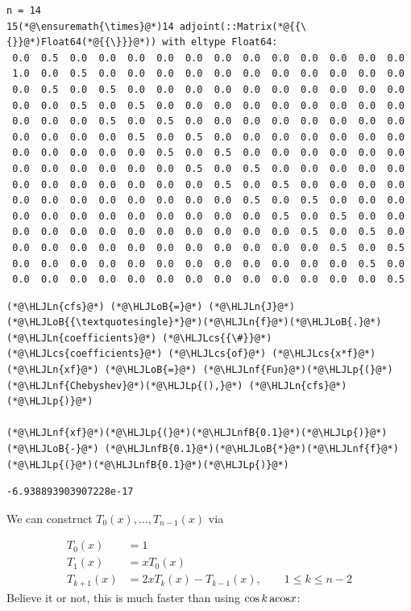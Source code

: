\documentclass[12pt,a4paper]{article}
\newcommand{\HLJLn}[1]{#1}
\newcommand{\HLJLnf}[1]{\textcolor[RGB]{66,102,213}{#1}}
\newcommand{\HLJLnfB}[1]{\textcolor[RGB]{59,151,46}{#1}}
\newcommand{\HLJLoB}[1]{\textcolor[RGB]{102,102,102}{\textbf{#1}}}
\newcommand{\HLJLp}[1]{#1}
\newcommand{\HLJLcs}[1]{\textcolor[RGB]{153,153,119}{\textit{#1}}}
\begin{document}
\begin{lstlisting}
n = 14
15(*@\ensuremath{\times}@*)14 adjoint(::Matrix(*@{{\{}}@*)Float64(*@{{\}}}@*)) with eltype Float64:
 0.0  0.5  0.0  0.0  0.0  0.0  0.0  0.0  0.0  0.0  0.0  0.0  0.0  0.0
 1.0  0.0  0.5  0.0  0.0  0.0  0.0  0.0  0.0  0.0  0.0  0.0  0.0  0.0
 0.0  0.5  0.0  0.5  0.0  0.0  0.0  0.0  0.0  0.0  0.0  0.0  0.0  0.0
 0.0  0.0  0.5  0.0  0.5  0.0  0.0  0.0  0.0  0.0  0.0  0.0  0.0  0.0
 0.0  0.0  0.0  0.5  0.0  0.5  0.0  0.0  0.0  0.0  0.0  0.0  0.0  0.0
 0.0  0.0  0.0  0.0  0.5  0.0  0.5  0.0  0.0  0.0  0.0  0.0  0.0  0.0
 0.0  0.0  0.0  0.0  0.0  0.5  0.0  0.5  0.0  0.0  0.0  0.0  0.0  0.0
 0.0  0.0  0.0  0.0  0.0  0.0  0.5  0.0  0.5  0.0  0.0  0.0  0.0  0.0
 0.0  0.0  0.0  0.0  0.0  0.0  0.0  0.5  0.0  0.5  0.0  0.0  0.0  0.0
 0.0  0.0  0.0  0.0  0.0  0.0  0.0  0.0  0.5  0.0  0.5  0.0  0.0  0.0
 0.0  0.0  0.0  0.0  0.0  0.0  0.0  0.0  0.0  0.5  0.0  0.5  0.0  0.0
 0.0  0.0  0.0  0.0  0.0  0.0  0.0  0.0  0.0  0.0  0.5  0.0  0.5  0.0
 0.0  0.0  0.0  0.0  0.0  0.0  0.0  0.0  0.0  0.0  0.0  0.5  0.0  0.5
 0.0  0.0  0.0  0.0  0.0  0.0  0.0  0.0  0.0  0.0  0.0  0.0  0.5  0.0
 0.0  0.0  0.0  0.0  0.0  0.0  0.0  0.0  0.0  0.0  0.0  0.0  0.0  0.5
\end{lstlisting}


\begin{lstlisting}
(*@\HLJLn{cfs}@*) (*@\HLJLoB{=}@*) (*@\HLJLn{J}@*)(*@\HLJLoB{{\textquotesingle}*}@*)(*@\HLJLn{f}@*)(*@\HLJLoB{.}@*)(*@\HLJLn{coefficients}@*) (*@\HLJLcs{{\#}}@*) (*@\HLJLcs{coefficients}@*) (*@\HLJLcs{of}@*) (*@\HLJLcs{x*f}@*)
(*@\HLJLn{xf}@*) (*@\HLJLoB{=}@*) (*@\HLJLnf{Fun}@*)(*@\HLJLp{(}@*)(*@\HLJLnf{Chebyshev}@*)(*@\HLJLp{(),}@*) (*@\HLJLn{cfs}@*)(*@\HLJLp{)}@*)

(*@\HLJLnf{xf}@*)(*@\HLJLp{(}@*)(*@\HLJLnfB{0.1}@*)(*@\HLJLp{)}@*) (*@\HLJLoB{-}@*) (*@\HLJLnfB{0.1}@*)(*@\HLJLoB{*}@*)(*@\HLJLnf{f}@*)(*@\HLJLp{(}@*)(*@\HLJLnfB{0.1}@*)(*@\HLJLp{)}@*)
\end{lstlisting}

\begin{lstlisting}
-6.938893903907228e-17
\end{lstlisting}


We can construct $T_0(x),\ldots,T_{n-1}(x)$ via


\begin{align*}
    T_0(x) &= 1\\
    T_1(x) &= x T_0(x) \\
    T_{k+1}(x) &= 2x  T_k(x) -  T_{k-1}(x), \qquad 1 \leq k \leq n-2
\end{align*}
Believe it or not, this is much faster than using $\cos k\, {\rm acos} x$:
\end{document}

